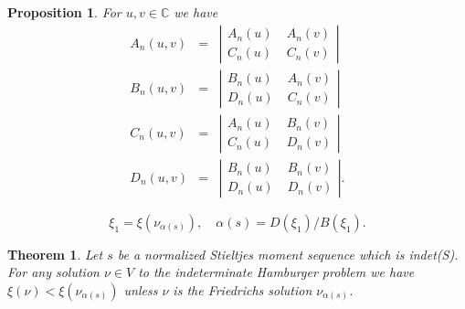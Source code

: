 \documentclass[10pt,a4paper]{amsart}
\newtheorem{prop}{Proposition}
\newtheorem{thm}{Theorem}
\newcommand{\C}{\mathbb{C}}
\def\D{\mathbb{D}}
\begin{document}
\begin{prop}\label{thm:2to1} For $u, v\in\C$ we have
 \begin{eqnarray*}
A_n(u,v)&=& \left|\begin{array}{cc}
 A_n(u)&\;A_n(v)\\C_n(u)&\;C_n(v)\end{array}\right|\\
 B_n(u,v)&=& \left|\begin{array}{cc}
 B_n(u)&\;A_n(v)\\D_n(u)&\;C_n(v)\end{array}\right|\\
  C_n(u,v)&=& \left|\begin{array}{cc}
 A_n(u)&\;B_n(v)\\C_n(u)&\;D_n(v)\end{array}\right|\\
  D_n(u,v)&=& \left|\begin{array}{cc}
 B_n(u)&\;B_n(v)\\D_n(u)&\;D_n(v)\end{array}\right|.
 \end{eqnarray*}
\end{prop}

\begin{equation}\label{eq:el1}
\xi_1=\xi(\nu_{\alpha(s)}),\quad \alpha(s)=D(\xi_1)/B(\xi_1).
\end{equation}

\begin{thm}\label{thm:Fr2} Let $s$ be a normalized Stieltjes moment sequence which is indet(S). For any solution $\nu\in V$ to the indeterminate Hamburger problem we have
$\xi(\nu)<\xi(\nu_{\alpha(s)})$ unless $\nu$ is the Friedrichs solution $\nu_{\alpha(s)}$.
\end{thm}
\end{document}

